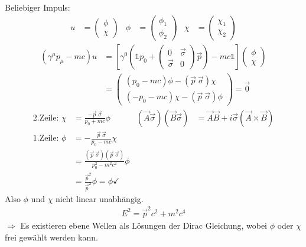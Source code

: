 Beliebiger Impuls:
	\begin{align*}
	u &= 
		\begin{pmatrix}
			\phi \\
			\chi
		\end{pmatrix} &
	\phi &= 
		\begin{pmatrix}
		\phi_1 \\
		\phi_2
		\end{pmatrix} &
	\chi &= 
		\begin{pmatrix}
		\chi_1 \\
		\chi_2
		\end{pmatrix}
	\end{align*}
	\begin{align*}
		\left( \gamma^\mu p_\mu - mc\right) u
		&=\left[
			\gamma^0 \left(
				\mathds{1} p_0 +
					\begin{pmatrix}
						0 & \vec{\sigma} \\
						\vec{\sigma} & 0
					\end{pmatrix} \vec{p}
				\right)
			-mc \mathds{1}
		\right]
		\begin{pmatrix}
			\phi \\
			\chi
		\end{pmatrix} \\
		&= \begin{pmatrix}
			(p_0 -mc) \phi - (\vec{p} ~\vec{\sigma}) \chi \\
			(-p_0 -mc) \chi - (\vec{p} ~\vec{\sigma}) \phi
		\end{pmatrix}
		= \vec{0}
	\end{align*}
	\begin{align*}
		\text{2.Zeile: }
		\chi &= \frac{- \vec{p}~\vec{\sigma}}{p_0 +mc} \phi 
		& (\vec{A}\vec{\sigma})(\vec{B}\vec{\sigma}) &=
		\vec{A}\vec{B}+ i \vec{\sigma} (\vec{A} \times \vec{B}) \\
		\text{1.Zeile: } 
		\phi &= - \frac{\vec{p}~\vec{\sigma}}{p_0 - mc} \chi \\
		&= \frac{(\vec{p}~\vec{\sigma})(\vec{p}~\vec{\sigma})}{p_0^2-m^2c^2} \phi \\
		&= \frac{\vec{p}^2}{\vec{p}^2}\phi = \phi \checkmark
	\end{align*}
Also $\phi$ und $\chi$ nicht linear unabhängig.
	\begin{align*}
		\boxed{E^2 = \vec{p}^2c^2 + m^2 c^4}
	\end{align*}
$\Rightarrow$ Es existieren ebene Wellen als Lösungen der Dirac Gleichung, wobei $\phi$ oder $\chi$ frei gewählt werden kann.

